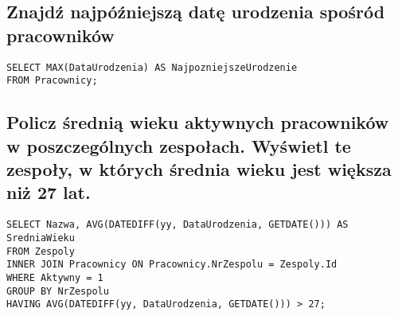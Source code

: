 \documentclass[a4paper]{article}
\begin{document}
\subsection{Znajdź najpóźniejszą datę urodzenia spośród pracowników}
\begin{verbatim}
SELECT MAX(DataUrodzenia) AS NajpozniejszeUrodzenie
FROM Pracownicy;
\end{verbatim}

\subsection{Policz średnią wieku aktywnych pracowników w poszczególnych zespołach. Wyświetl te zespoły, w których średnia wieku jest większa niż 27 lat.}

\begin{verbatim}
SELECT Nazwa, AVG(DATEDIFF(yy, DataUrodzenia, GETDATE())) AS SredniaWieku
FROM Zespoly
INNER JOIN Pracownicy ON Pracownicy.NrZespolu = Zespoly.Id
WHERE Aktywny = 1
GROUP BY NrZespolu
HAVING AVG(DATEDIFF(yy, DataUrodzenia, GETDATE())) > 27;
\end{verbatim}
\end{document}
